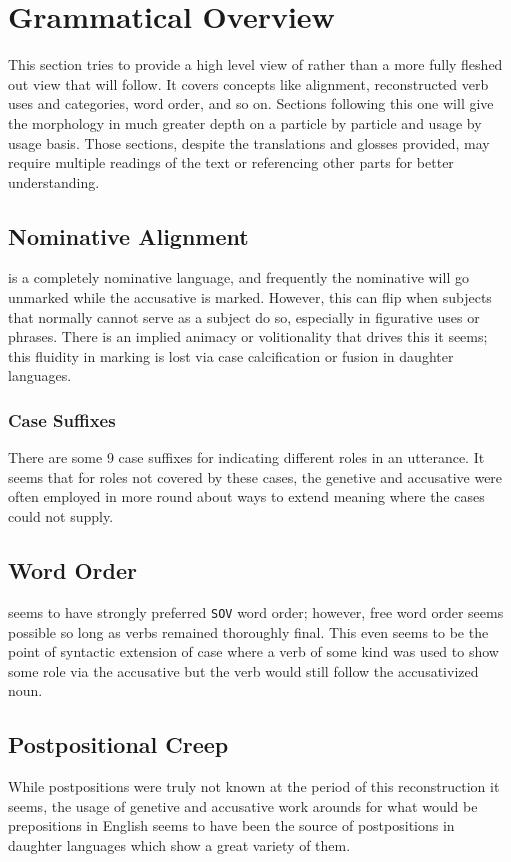 \section{Grammatical Overview}
This section tries to provide a high level view of \langname rather than a more fully fleshed out view that will follow. It covers concepts like alignment, reconstructed verb uses and categories, word order, and so on. Sections following this one will give the morphology in much greater depth on a particle by particle and usage by usage basis. Those sections, despite the translations and glosses provided, may require multiple readings of the text or referencing other parts for better understanding.
\subsection{Nominative Alignment}
\langname is a completely nominative language, and frequently the nominative will go unmarked while the accusative is marked. However, this can flip when subjects that normally cannot serve as a subject do so, especially in figurative uses or phrases. There is an implied animacy or volitionality that drives this it seems; this fluidity in marking is lost via case calcification or fusion in daughter languages.
\subsubsection{Case Suffixes}
There are some 9 case suffixes for indicating different roles in an utterance. It seems that for roles not covered by these cases, the genetive and accusative were often employed in more round about ways to extend meaning where the cases could not supply.
\subsection{Word Order}
\langname seems to have strongly preferred \texttt{SOV} word order; however, free word order seems possible so long as verbs remained thoroughly final. This even seems to be the point of syntactic extension of case where a verb of some kind was used to show some role via the accusative but the verb would still follow the accusativized noun.
\subsection{Postpositional Creep}
While postpositions were truly not known at the period of this reconstruction it seems, the usage of genetive and accusative work arounds for what would be prepositions in English seems to have been the source of postpositions in daughter languages which show a great variety of them.
